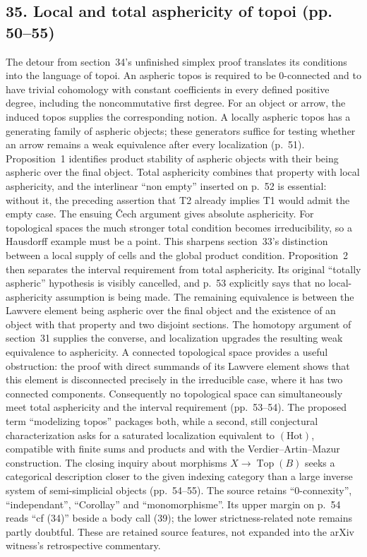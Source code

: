 \documentclass[10pt,oneside]{book}
\begin{document}
\subsection*{35. Local and total asphericity of topoi (pp. 50--55)}
The detour from section~34's unfinished simplex proof translates its conditions into the language of topoi. An aspheric topos is required to be $0$-connected and to have trivial cohomology with constant coefficients in every defined positive degree, including the noncommutative first degree. For an object or arrow, the induced topos supplies the corresponding notion. A locally aspheric topos has a generating family of aspheric objects; these generators suffice for testing whether an arrow remains a weak equivalence after every localization (p.~51). Proposition~1 identifies product stability of aspheric objects with their being aspheric over the final object. Total asphericity combines that property with local asphericity, and the interlinear ``non empty'' inserted on p.~52 is essential: without it, the preceding assertion that T2 already implies T1 would admit the empty case. The ensuing \v{C}ech argument gives absolute asphericity. For topological spaces the much stronger total condition becomes irreducibility, so a Hausdorff example must be a point. This sharpens section~33's distinction between a local supply of cells and the global product condition. Proposition~2 then separates the interval requirement from total asphericity. Its original ``totally aspheric'' hypothesis is visibly cancelled, and p.~53 explicitly says that no local-asphericity assumption is being made. The remaining equivalence is between the Lawvere element being aspheric over the final object and the existence of an object with that property and two disjoint sections. The homotopy argument of section~31 supplies the converse, and localization upgrades the resulting weak equivalence to asphericity. A connected topological space provides a useful obstruction: the proof with direct summands of its Lawvere element shows that this element is disconnected precisely in the irreducible case, where it has two connected components. Consequently no topological space can simultaneously meet total asphericity and the interval requirement (pp.~53--54). The proposed term ``modelizing topos'' packages both, while a second, still conjectural characterization asks for a saturated localization equivalent to $(\mathrm{Hot})$, compatible with finite sums and products and with the Verdier--Artin--Mazur construction. The closing inquiry about morphisms $X\to\operatorname{Top}(B)$ seeks a categorical description closer to the given indexing category than a large inverse system of semi-simplicial objects (pp.~54--55). The source retains ``0-connexity'', ``independant'', ``Corollay'' and ``monomorphisme''. Its upper margin on p.~54 reads ``cf (34)'' beside a body call (39); the lower strictness-related note remains partly doubtful. These are retained source features, not expanded into the arXiv witness's retrospective commentary.
\end{document}
